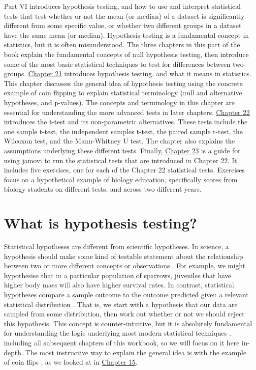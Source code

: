 \documentclass[
]{scrbook}
\begin{document}
Part VI introduces hypothesis testing, and how to use and interpret statistical tests that test whether or not the mean (or median) of a dataset is significantly different from some specific value, or whether two different groups in a dataset have the same mean (or median).
Hypothesis testing is a fundamental concept in statistics, but it is often misunderstood.
The three chapters in this part of the book explain the fundamental concepts of null hypothesis testing, then introduce some of the most basic statistical techniques to test for differences between two groups.
\protect\hyperlink{Chapter_21}{Chapter 21} introduces hypothesis testing, and what it means in statistics. This chapter discusses the general idea of hypothesis testing using the concrete example of coin flipping to explain statistical terminology (null and alternative hypotheses, and p-values).
The concepts and terminology in this chapter are essential for understanding the more advanced tests in later chapters.
\protect\hyperlink{Chapter_22}{Chapter 22} introduces the t-test and its non-parametric alternatives.
These tests include the one sample t-test, the independent samples t-test, the paired sample t-test, the Wilcoxon test, and the Mann-Whitney U test.
The chapter also explains the assumptions underlying these different tests.
Finally, \protect\hyperlink{Chapter_23}{Chapter 23} is a guide for using jamovi to run the statistical tests that are introduced in Chapter 22.
It includes five exercises, one for each of the Chapter 22 statistical tests.
Exercises focus on a hypothetical example of biology education, specifically scores from biology students on different tests, and across two different years.

\hypertarget{Chapter_21}{%
\chapter{What is hypothesis testing?}\label{Chapter_21}}

Statistical hypotheses are different from scientific hypotheses.
In science, a hypothesis should make some kind of testable statement about the relationship between two or more different concepts or observations \citep{Bouma2000}.
For example, we might hypothesise that in a particular population of sparrows, juveniles that have higher body mass will also have higher survival rates.
In contrast, statistical hypotheses compare a sample outcome to the outcome predicted given a relevant statistical distribution \citep{Sokal1995}.
That is, we start with a hypothesis that our data are sampled from some distribution, then work out whether or not we should reject this hypothesis.
This concept is counter-intuitive, but it is absolutely fundamental for understanding the logic underlying most modern statistical techniques \citep{Sokal1995, Mayo1996, Greenland2016}, including all subsequent chapters of this workbook, so we will focus on it here in-depth.
The most instructive way to explain the general idea is with the example of coin flips \citep{Mayo1996}, as we looked at in \protect\hyperlink{Chapter_15}{Chapter 15}.
\end{document}
